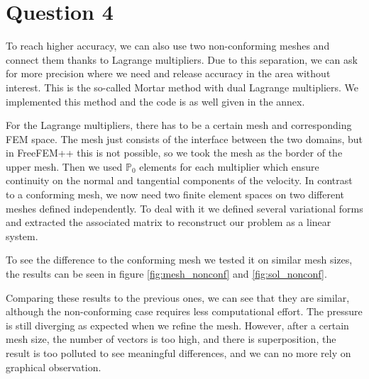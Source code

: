 \documentclass{article}
\begin{document}
\section*{Question 4}
To reach higher accuracy, we can also use two non-conforming meshes and connect
them thanks to Lagrange multipliers. Due to this separation, we can ask for
more precision where we need and release accuracy in the area without interest.
This is the so-called Mortar method with dual Lagrange multipliers. We
implemented this method and the code is as well given in the annex.

For the Lagrange multipliers, there has to be a certain mesh and corresponding
FEM space. The mesh just consists of the interface between the two domains, but
in FreeFEM++ this is not possible, so we took the mesh as the border of the
upper mesh. Then we used $\mathbb{P}_0$ elements for each multiplier which
ensure continuity on the normal and tangential components of the velocity. In
contrast to a conforming mesh, we now need two finite element spaces on two
different meshes defined independently. To deal with it we defined several
variational forms and extracted the associated matrix to reconstruct our
problem as a linear system.

To see the difference to the conforming mesh we tested it on similar mesh sizes, the results can be seen in figure \ref{fig:mesh_nonconf} and \ref{fig:sol_nonconf}.

Comparing these results to the previous ones, we can see that they are
similar, although the non-conforming case requires less computational effort. The
pressure is still diverging as expected when we refine the mesh. However, after a certain mesh size, the number of vectors is too high, and there is superposition, the result is too polluted to see meaningful differences, and we can no more rely on graphical observation. 
\end{document}

